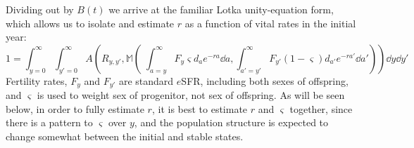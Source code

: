 Dividing out by $B(t)$ we arrive at the familiar Lotka unity-equation form,
which allows us to isolate and estimate $r$ as a function of vital rates in the
initial year:
\begin{equation}
\label{eq:ex2sexCRunity}
1 = \int_{y=0}^\infty \int_{y'=0}^\infty
A\left(R_{y,y'},\mathbb{M}\left(\;\int_{a=y}^\infty F_y \varsigma d_a
e^{-ra} \dd a, \int _{a'=y'}^\infty F_{y'} (1-\varsigma) d_{a'} e^{-ra'} \dd
a'\right)\right) \dd y
\dd y'
\end{equation} 
Fertility rates, $F_y$ and $F_{y'}$ are standard $e$SFR, including both sexes
of offspring, and $\varsigma$ is used to weight sex of
progenitor, not sex of offspring. As will be seen below, in order to fully estimate $r$, it is best
to estimate $r$ and $\varsigma$ together, since there is a pattern to
$\varsigma$ over $y$, and the population structure is expected to change
somewhat between the initial and stable states. 


\FloatBarrier
